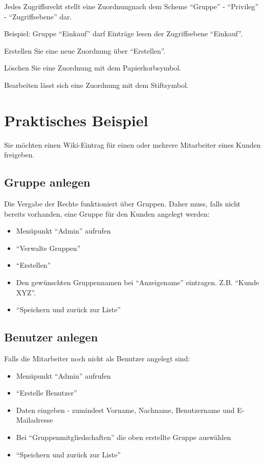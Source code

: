 \documentclass[article, a4paper, oneside, 11pt]{memoir}
\begin{document}
Jedes Zugriffsrecht stellt eine Zuordnungnach dem Scheme "`Gruppe"' - "`Privileg"' - "`Zugriffsebene"' dar.

Beispiel: Gruppe "`Einkauf"' darf Einträge lesen der Zugriffsebene "`Einkauf"'.

Erstellen Sie eine neue Zuordnung über "`Erstellen"'.

Löschen Sie eine Zuordnung mit dem Papierkorbsymbol.

Bearbeiten lässt sich eine Zuordnung mit dem Stiftsymbol.


\section{Praktisches Beispiel}

Sie möchten einen Wiki-Eintrag für einen oder mehrere Mitarbeiter eines Kunden freigeben.

\subsection{Gruppe anlegen}
Die Vergabe der Rechte funktioniert über Gruppen. Daher muss, falls nicht bereits vorhanden, eine Gruppe für den Kunden angelegt werden:

\begin{itemize}
\item Menüpunkt "`Admin"' aufrufen
\item "`Verwalte Gruppen"'
\item "`Erstellen"'
\item Den gewünschten Gruppennamen bei "`Anzeigename"' eintragen. Z.B. "`Kunde XYZ"'.
\item "`Speichern und zurück zur Liste"'
\end{itemize}

\subsection{Benutzer anlegen}
Falls die Mitarbeiter noch nicht als Benutzer angelegt sind:

\begin{itemize}
\item Menüpunkt "`Admin"' aufrufen
\item "`Erstelle Benutzer"'
\item Daten eingeben - zumindest Vorname, Nachname, Benutzername und E-Mailadresse
\item Bei "`Gruppenmitgliedschaften"' die oben erstellte Gruppe auswählen
\item "`Speichern und zurück zur Liste"'
\end{itemize}
\end{document}
